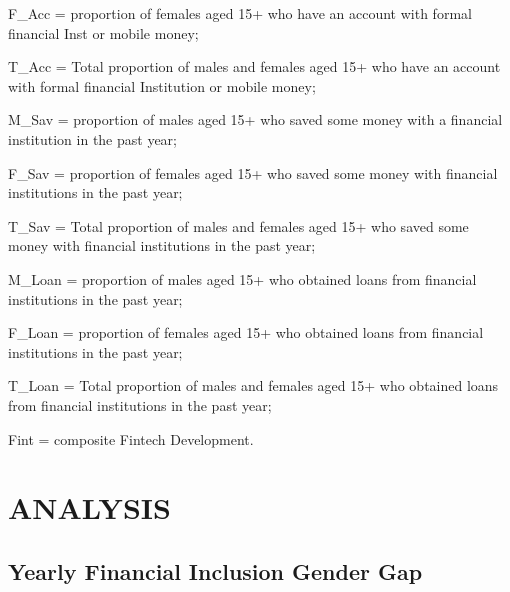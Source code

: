 \documentclass[preprint, 3p,
authoryear]{elsarticle} %
\begin{document}
\vspace{1pt}

F\_Acc = proportion of females aged 15+ who have an account with formal
financial Inst or mobile money;

\vspace{1pt}

T\_Acc = Total proportion of males and females aged 15+ who have an
account with formal financial Institution or mobile money;

\vspace{1pt}

M\_Sav = proportion of males aged 15+ who saved some money with a
financial institution in the past year; \vspace{1pt}

F\_Sav = proportion of females aged 15+ who saved some money with
financial institutions in the past year;

\vspace{1pt}

T\_Sav = Total proportion of males and females aged 15+ who saved some
money with financial institutions in the past year;

\vspace{1pt}

M\_Loan = proportion of males aged 15+ who obtained loans from financial
institutions in the past year;

\vspace{1pt}

F\_Loan = proportion of females aged 15+ who obtained loans from
financial institutions in the past year; \vspace{1pt}

T\_Loan = Total proportion of males and females aged 15+ who obtained
loans from financial institutions in the past year;

\vspace{1pt}

Fint = composite Fintech Development.

\hypertarget{analysis}{%
\section{ANALYSIS}\label{analysis}}

\hypertarget{yearly-financial-inclusion-gender-gap}{%
\subsection{Yearly Financial Inclusion Gender
Gap}\label{yearly-financial-inclusion-gender-gap}}
\end{document}
